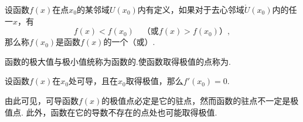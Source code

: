 \begin{definition}[极值点]
设函数\(f(x)\)在点\(x_0\)的某邻域\(U(x_0)\)内有定义，如果对于去心邻域\(\mathring{U}(x_0)\)内的任一\(x\)，有\[
f(x)<f(x_0) \quad \text{（或}f(x)>f(x_0)\text{）},
\]那么称\(f(x_0)\)是函数\(f(x)\)的一个（或）.

函数的极大值与极小值统称为函数的.使函数取得极值的点称为.
\end{definition}

\begin{theorem}[函数存在极值的必要条件]\label{theorem:微分中值定理.函数存在极值的必要条件}
设函数\(f(x)\)在\(x_0\)处可导，且在\(x_0\)取得极值，那么\(f'(x_0)=0\).
\end{theorem}
由此可见，可导函数\(f(x)\)的极值点必定是它的驻点，然而函数的驻点不一定是极值点.
此外，函数在它的导数不存在的点处也可能取得极值.

